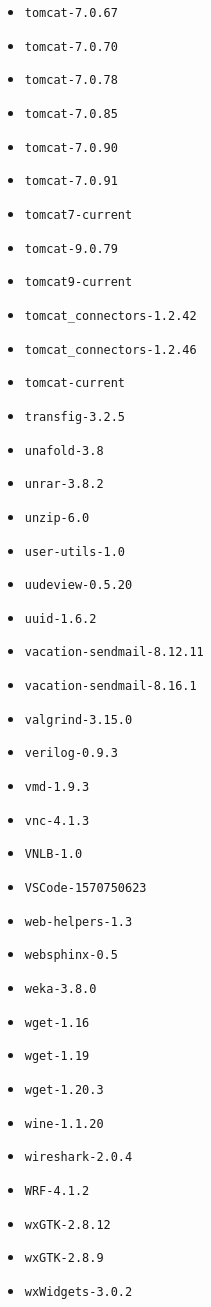 \begin{multicols}{3}
\begin{itemize}
\item \verb|tomcat-7.0.67|
\item \verb|tomcat-7.0.70|
\item \verb|tomcat-7.0.78|
\item \verb|tomcat-7.0.85|
\item \verb|tomcat-7.0.90|
\item \verb|tomcat-7.0.91|
\item \verb|tomcat7-current|
\item \verb|tomcat-9.0.79|
\item \verb|tomcat9-current|
\item \verb|tomcat_connectors-1.2.42|
\item \verb|tomcat_connectors-1.2.46|
\item \verb|tomcat-current|
\item \verb|transfig-3.2.5|
\item \verb|unafold-3.8|
\item \verb|unrar-3.8.2|
\item \verb|unzip-6.0|
\item \verb|user-utils-1.0|
\item \verb|uudeview-0.5.20|
\item \verb|uuid-1.6.2|
\item \verb|vacation-sendmail-8.12.11|
\item \verb|vacation-sendmail-8.16.1|
\item \verb|valgrind-3.15.0|
\item \verb|verilog-0.9.3|
\item \verb|vmd-1.9.3|
\item \verb|vnc-4.1.3|
\item \verb|VNLB-1.0|
\item \verb|VSCode-1570750623|
\item \verb|web-helpers-1.3|
\item \verb|websphinx-0.5|
\item \verb|weka-3.8.0|
\item \verb|wget-1.16|
\item \verb|wget-1.19|
\item \verb|wget-1.20.3|
\item \verb|wine-1.1.20|
\item \verb|wireshark-2.0.4|
\item \verb|WRF-4.1.2|
\item \verb|wxGTK-2.8.12|
\item \verb|wxGTK-2.8.9|
\item \verb|wxWidgets-3.0.2|

\end{itemize}
\end{multicols}
